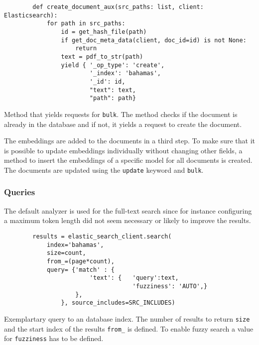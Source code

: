 \begin{listing}[htp]
    \begin{verbatim}
        def create_document_aux(src_paths: list, client: Elasticsearch):  
            for path in src_paths:           
                id = get_hash_file(path)
                if get_doc_meta_data(client, doc_id=id) is not None:
                    return
                text = pdf_to_str(path)
                yield { '_op_type': 'create',
                        '_index': 'bahamas',
                        '_id': id,
                        "text": text,
                        "path": path}
    \end{verbatim}
    \caption{Method that yields requests for \texttt{bulk}.
    The method checks if the document is already in the database and if not, it yields a request to create the document.
    }
    \label{lst:db_bulk_yield}
\end{listing}

The embeddings are added to the documents in a third step.
To make sure that it is possible to update embeddings individually without changing other fields, 
a method to insert the embeddings of a specific model for all documents is created.
The documents are updated using the \texttt{update} keyword and \texttt{bulk}.


\subsubsection*{Queries}
The default analyzer is used for the full-text search since for instance configuring a maximum token length did not seem necessary or likely to improve the results.

\begin{listing}[htp]
    \begin{verbatim}
        results = elastic_search_client.search(
            index='bahamas', 
            size=count,
            from_=(page*count),
            query= {'match' : {
                        'text': {   'query':text,
                                    'fuzziness': 'AUTO',}
                    }, 
                }, source_includes=SRC_INCLUDES)
    \end{verbatim}
    \caption{Exemplartary query to an \databaseName database index.
    The number of results to return \texttt{size} and the start index of the results \texttt{from\_} is defined.
    To enable fuzzy search a value for \texttt{fuzziness} has to be defined. 
    }
    \label{lst:fuzzy_query}
\end{listing}

